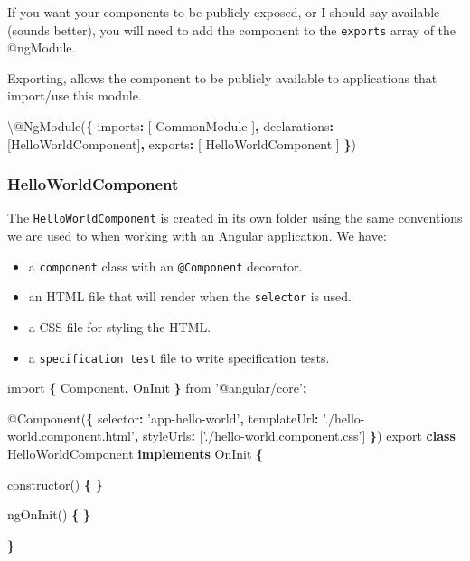 \documentclass[]{book}
\newenvironment{Shaded}{\begin{snugshade}}{\end{snugshade}}
\newcommand{\KeywordTok}[1]{\textcolor[rgb]{0.13,0.29,0.53}{\textbf{#1}}}
\newcommand{\DataTypeTok}[1]{\textcolor[rgb]{0.13,0.29,0.53}{#1}}
\newcommand{\StringTok}[1]{\textcolor[rgb]{0.31,0.60,0.02}{#1}}
\newcommand{\ImportTok}[1]{#1}
\newcommand{\OperatorTok}[1]{\textcolor[rgb]{0.81,0.36,0.00}{\textbf{#1}}}
\newcommand{\AttributeTok}[1]{\textcolor[rgb]{0.77,0.63,0.00}{#1}}
\newcommand{\NormalTok}[1]{#1}
\providecommand{\tightlist}{%
  \setlength{\itemsep}{0pt}\setlength{\parskip}{0pt}}
\theoremstyle{definition}
\theoremstyle{definition}
\theoremstyle{definition}
\theoremstyle{remark}
\begin{document}
If you want your components to be publicly exposed, or I should say
available (sounds better), you will need to add the component to the
\texttt{exports} array of the @ngModule.

Exporting, allows the component to be publicly available to applications
that import/use this module.

\begin{Shaded}
\begin{Highlighting}[]
\NormalTok{\textbackslash{}@}\AttributeTok{NgModule}\NormalTok{(}\OperatorTok{\{}
  \DataTypeTok{imports}\OperatorTok{:}\NormalTok{ [}
\NormalTok{    CommonModule}
\NormalTok{  ]}\OperatorTok{,}
  \DataTypeTok{declarations}\OperatorTok{:}\NormalTok{ [HelloWorldComponent]}\OperatorTok{,}
  \DataTypeTok{exports}\OperatorTok{:}\NormalTok{ [}
\NormalTok{    HelloWorldComponent}
\NormalTok{  ]}
\OperatorTok{\}}\NormalTok{)}
\end{Highlighting}
\end{Shaded}

\subsubsection{HelloWorldComponent}\label{helloworldcomponent}

The \texttt{HelloWorldComponent} is created in its own folder using the
same conventions we are used to when working with an Angular
application. We have:

\begin{itemize}
\tightlist
\item
  a \texttt{component} class with an \texttt{@Component} decorator.
\item
  an HTML file that will render when the \texttt{selector} is used.
\item
  a CSS file for styling the HTML.
\item
  a \texttt{specification\ test} file to write specification tests.
\end{itemize}

\begin{Shaded}
\begin{Highlighting}[]
\ImportTok{import} \OperatorTok{\{}\NormalTok{ Component}\OperatorTok{,}\NormalTok{ OnInit }\OperatorTok{\}} \ImportTok{from} \StringTok{'@angular/core'}\OperatorTok{;}

\NormalTok{@}\AttributeTok{Component}\NormalTok{(}\OperatorTok{\{}
  \DataTypeTok{selector}\OperatorTok{:} \StringTok{'app-hello-world'}\OperatorTok{,}
  \DataTypeTok{templateUrl}\OperatorTok{:} \StringTok{'./hello-world.component.html'}\OperatorTok{,}
  \DataTypeTok{styleUrls}\OperatorTok{:}\NormalTok{ [}\StringTok{'./hello-world.component.css'}\NormalTok{]}
\OperatorTok{\}}\NormalTok{)}
\ImportTok{export} \KeywordTok{class}\NormalTok{ HelloWorldComponent }\KeywordTok{implements}\NormalTok{ OnInit }\OperatorTok{\{}

  \AttributeTok{constructor}\NormalTok{() }\OperatorTok{\{} \OperatorTok{\}}

  \AttributeTok{ngOnInit}\NormalTok{() }\OperatorTok{\{}
  \OperatorTok{\}}

\OperatorTok{\}}
\end{Highlighting}
\end{Shaded}
\end{document}
